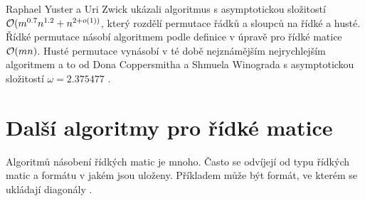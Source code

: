 Raphael Yuster a Uri Zwick ukázali algoritmus \cite{DBLP:journals/talg/YusterZ05} s asymptotickou složitostí $\mathcal{O}(m^{0.7}n^{1.2}+n^{2+o(1))}$, který rozdělí permutace řádků a sloupců na řídké a husté. Řídké permutace násobí algoritmem podle definice v úpravě pro řídké matice $\mathcal{O}(mn)$. Husté permutace vynásobí v té době nejznámějším nejrychlejším algoritmem a to od Dona Coppersmitha a Shmuela Winograda s asymptotickou složitostí $\omega=2.375477$ \cite{DBLP:journals/jsc/CoppersmithW90}.

\section{Další algoritmy pro řídké matice}

Algoritmů násobení řídkých matic je mnoho. Často se odvíjejí od typu řídkých matic a formátu v jakém jsou uloženy. Příkladem může být formát, ve kterém se ukládají diagonály \cite{diagonalTvrdikSimecek}.
